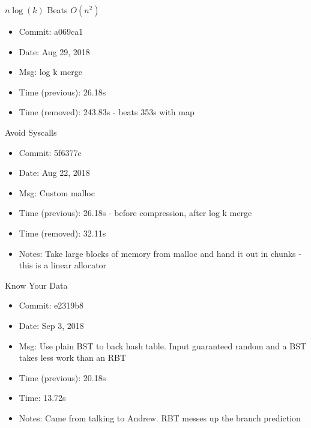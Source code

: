 \documentclass{beamer}
\begin{document}

\begin{frame}{$n \log(k)$ Beats $O(n^2)$}
	\begin{itemize}
	\item Commit: a069ca1
	\item Date: Aug 29, 2018
	\item Msg: log k merge
	\item Time (previous): 26.18s
	\item Time (removed): 243.83s - beats 353s with map
	\end{itemize}
	\logkmerge
\end{frame}

\begin{frame}{Avoid Syscalls}
	\begin{itemize}
	\item Commit: 5f6377c
	\item Date: Aug 22, 2018
	\item Msg: Custom malloc
	\item Time (previous): 26.18s - before compression, after log k merge
	\item Time (removed): 32.11s
	\item Notes: Take large blocks of memory from malloc and hand it out in chunks - this is a linear allocator
	\end{itemize}
\end{frame}

\begin{frame}{Know Your Data}
	\begin{itemize}
	\item Commit: e2319b8
	\item Date: Sep 3, 2018
	\item Msg: Use plain BST to back hash table. Input guaranteed random and a BST takes less work than an RBT
	\item Time (previous): 20.18s
	\item Time: 13.72s
	\item Notes: Came from talking to Andrew. RBT messes up the branch prediction
	\end{itemize}
\end{frame}
\end{document}
